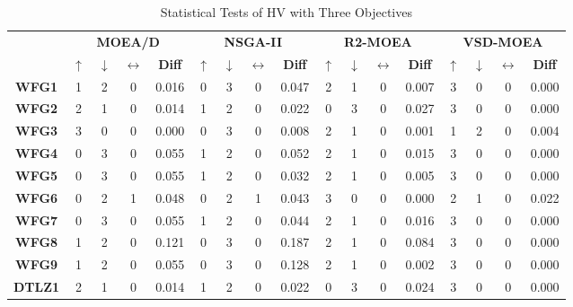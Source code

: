 \begin{table*}[t]
\caption{Statistical Tests of HV with Three Objectives}
\label{tab:Tests_HV_3obj}
\centering
\begin{tabular}{c|c|c|c|c|c|c|c|c|c|c|c|c|c|c|c|c|}
\cline{2-17}
\textbf{} & \multicolumn{4}{c|}{\textbf{MOEA/D}} & \multicolumn{4}{c|}{\textbf{NSGA-II}} & \multicolumn{4}{c|}{\textbf{R2-MOEA}} & \multicolumn{4}{c|}{\textbf{VSD-MOEA}} \\ \cline{2-17} 
 & \textbf{$\uparrow$} & \textbf{$\downarrow$} & \textbf{$\leftrightarrow$} & \textbf{Diff} & \textbf{$\uparrow$} & \textbf{$\downarrow$} & \textbf{$\leftrightarrow$} & \textbf{Diff} & \textbf{$\uparrow$} & \textbf{$\downarrow$} & \textbf{$\leftrightarrow$} & \textbf{Diff} & \textbf{$\uparrow$} & \textbf{$\downarrow$} & \textbf{$\leftrightarrow$} & \textbf{Diff} \\ \hline
\multicolumn{1}{|c|}{\textbf{WFG1}} & 1 & 2 & 0 & 0.016 & 0 & 3 & 0 & 0.047 & 2 & 1 & 0 & 0.007 & 3 & 0 & 0 & 0.000 \\ \hline
\multicolumn{1}{|c|}{\textbf{WFG2}} & 2 & 1 & 0 & 0.014 & 1 & 2 & 0 & 0.022 & 0 & 3 & 0 & 0.027 & 3 & 0 & 0 & 0.000 \\ \hline
\multicolumn{1}{|c|}{\textbf{WFG3}} & 3 & 0 & 0 & 0.000 & 0 & 3 & 0 & 0.008 & 2 & 1 & 0 & 0.001 & 1 & 2 & 0 & 0.004 \\ \hline
\multicolumn{1}{|c|}{\textbf{WFG4}} & 0 & 3 & 0 & 0.055 & 1 & 2 & 0 & 0.052 & 2 & 1 & 0 & 0.015 & 3 & 0 & 0 & 0.000 \\ \hline
\multicolumn{1}{|c|}{\textbf{WFG5}} & 0 & 3 & 0 & 0.055 & 1 & 2 & 0 & 0.032 & 2 & 1 & 0 & 0.005 & 3 & 0 & 0 & 0.000 \\ \hline
\multicolumn{1}{|c|}{\textbf{WFG6}} & 0 & 2 & 1 & 0.048 & 0 & 2 & 1 & 0.043 & 3 & 0 & 0 & 0.000 & 2 & 1 & 0 & 0.022 \\ \hline
\multicolumn{1}{|c|}{\textbf{WFG7}} & 0 & 3 & 0 & 0.055 & 1 & 2 & 0 & 0.044 & 2 & 1 & 0 & 0.016 & 3 & 0 & 0 & 0.000 \\ \hline
\multicolumn{1}{|c|}{\textbf{WFG8}} & 1 & 2 & 0 & 0.121 & 0 & 3 & 0 & 0.187 & 2 & 1 & 0 & 0.084 & 3 & 0 & 0 & 0.000 \\ \hline
\multicolumn{1}{|c|}{\textbf{WFG9}} & 1 & 2 & 0 & 0.055 & 0 & 3 & 0 & 0.128 & 2 & 1 & 0 & 0.002 & 3 & 0 & 0 & 0.000 \\ \hline
\multicolumn{1}{|c|}{\textbf{DTLZ1}} & 2 & 1 & 0 & 0.014 & 1 & 2 & 0 & 0.022 & 0 & 3 & 0 & 0.024 & 3 & 0 & 0 & 0.000 \\ \hline

\end{tabular}
\end{table*}
